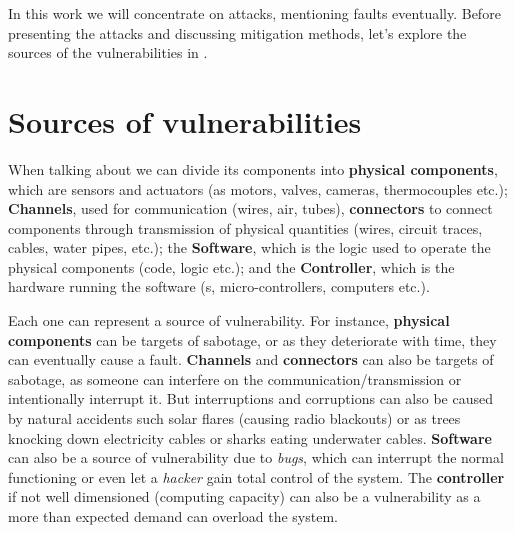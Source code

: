\documentclass[../main.tex]{subfiles}
\begin{document}
In this work we will concentrate on attacks, mentioning faults eventually.
Before presenting the attacks and discussing mitigation methods, let's explore the sources of the vulnerabilities in \cps{}.

\section{Sources of vulnerabilities}

When talking about \cps{} we can divide its components into \textbf{physical components}, which are sensors and actuators (as motors, valves, cameras, thermocouples etc.);
\textbf{Channels}, used for communication (wires, air, tubes), \textbf{connectors} to connect components through transmission of physical quantities (wires, circuit traces, cables, water pipes, etc.);
the \textbf{Software}, which is the logic used to operate the physical components (code, \plc{} logic etc.); and the \textbf{Controller}, which is the hardware running the software (\plc{}s, micro-controllers, computers etc.).

Each one can represent a source of vulnerability. For instance, \textbf{physical components} can be targets of sabotage, or as they deteriorate with time, they can eventually cause a fault.
\textbf{Channels} and \textbf{connectors} can also be targets of sabotage, as someone can interfere on the communication/transmission or intentionally interrupt it. But interruptions and corruptions can also be caused by natural accidents such solar flares (causing radio blackouts) or as trees knocking down electricity cables or sharks eating underwater cables.
\textbf{Software} can also be a source of vulnerability due to \emph{bugs}, which can interrupt the normal functioning or even let a \emph{hacker} gain total control of the system.
The \textbf{controller} if not well dimensioned (computing capacity) can also be a vulnerability as a more than expected demand can overload the system.


\printbibliography%
\end{document}
